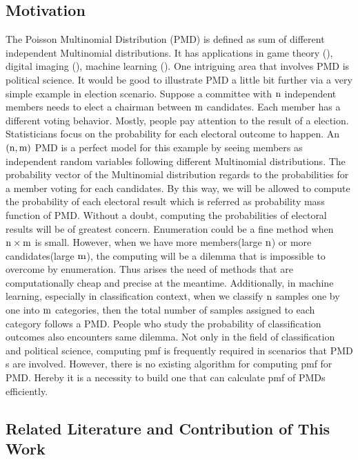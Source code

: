 \documentclass[12pt]{article}
\newcommand{\PMD}{\textrm{PMD}}
\begin{document}
\subsection{Motivation}

The Poisson Multinomial Distribution ($\PMD$) is defined as sum of different independent Multinomial distributions. It has applications in game theory (), digital imaging (), machine learning (). One intriguing area that involves $\PMD$ is political science. It would be good to illustrate $\PMD$ a little bit further via a very simple example in election scenario. Suppose a committee with $\rm n$  independent members needs to elect a chairman between $\rm m$ candidates. Each member has a different voting behavior. Mostly, people pay attention to the result of a election. Statisticians focus on the probability for each electoral outcome to happen. An $\rm (n,m)$ $\PMD$ is a perfect model for this example by seeing members as independent random variables following different Multinomial distributions. The probability vector of the Multinomial distribution regards to the probabilities for a member voting for each candidates. By this way, we will be allowed to compute the probability of each electoral result which is referred as probability mass function of $\PMD$. Without a doubt, computing the probabilities of electoral results will be of greatest concern. Enumeration could be a fine method when $\rm n \times m$ is small. However, when we have more members(large $\rm n$) or more candidates(large $\rm m$), the computing will be a dilemma that is impossible to overcome by enumeration. Thus arises the need of methods that are computationally cheap and precise at the meantime. Additionally, in machine learning, especially in classification context, when we classify $\rm n$ samples one by one into $\rm m$ categories, then the total number of samples assigned to each category follows a $\PMD$. People who study the probability of classification outcomes also encounters same dilemma. Not only in the field of classification and political science, computing pmf is frequently required in scenarios that $\PMD$s are involved. However, there is no existing algorithm for computing pmf for PMD. Hereby it is a necessity to build one that can calculate pmf of $\PMD$s efficiently.



\subsection{Related Literature and Contribution of This Work}
\end{document}
